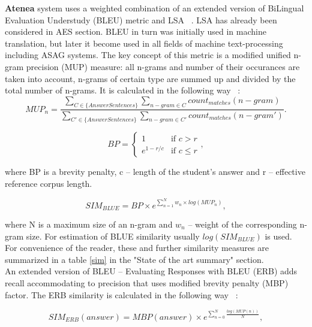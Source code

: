 \textbf{Atenea} system uses a weighted combination of an extended version of BiLingual Evaluation Understudy (BLEU) metric and LSA ~\cite{ERB}. LSA has already been considered in AES section. BLEU in turn was initially used in machine translation, but later it become used in all fields of machine text-processing including ASAG systems. The key concept of this metric is a modified unified n-gram precision (MUP) measure: all n-grams and number of their occurances are taken into account, n-grams of certain type are summed up and divided by the total number of n-grams. It is calculated in the following way ~\cite{BLEU}:\\

\begin{equation} \label{eq:MUP}
MUP_n = \frac{\sum\limits_{C \in \{AnswerSentences\}} \sum\limits_{n-gram \in C} count_{matches}(n-gram)}{\sum\limits_{C' \in \{AnswerSentences\}} \sum\limits_{n-gram \in C'} count_{matches}(n-gram')}.
\end{equation}

\begin{equation} \label{eq:BP}
BP = \begin{cases}
   1 &\text{if $c>r$}\\
   e^{1-r/c} &\text{if $c \leq r$}
 \end{cases},
\end{equation}

where BP is a brevity penalty, c -- length of the student's answer and r -- effective reference corpus length.

\begin{equation} \label{eq:BLUE}
SIM_{BLUE} = BP \times e^{\sum^N_{n=1}w_n \times log(MUP_n)},
\end{equation}

where N is a maximum size of an n-gram and $w_n$ -- weight of the corresponding n-gram size. For estimation of BLUE similarity usually $log(SIM_{BLUE})$ is used. \\

For convenience of the reader, these and further similarity measures are summarized in a table \ref{sim} in the "State of the art summary" section.\\

An extended version of BLEU -- Evaluating Responses with BLEU (ERB) adds recall accommodating to precision that uses modified brevity penalty (MBP) factor. The ERB similarity is calculated in the following way ~\cite{ERB}:

\begin{equation} \label{eq:ERB}
SIM_{ERB}(answer) = MBP(answer)\times e^{\sum^{N}_{n=0}\frac{log(MUP(n))}{N}},
\end{equation}

